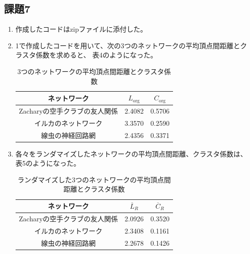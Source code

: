 \documentclass[12pt]{jarticle}
\begin{document}
\clearpage

\subsection{課題7}

\begin{enumerate}
    \item 作成したコードはzipファイルに添付した。
    \item 1で作成したコードを用いて、次の3つのネットワークの平均頂点間距離とクラスタ係数を求めると、
          表4のようになった。

          \begin{table}[htb]
              \caption{3つのネットワークの平均頂点間距離とクラスタ係数}
              \begin{center}
                  \begin{tabular}{|c||c|c|}
                      \hline
                      ネットワーク                  & $L_{\text{org}}$ & $C_{\text{org}}$ \\ \hline \hline
                      Zacharyの空手クラブの友人関係 & 2.4082           & 0.5706           \\ \hline
                      イルカのネットワーク          & 3.3570           & 0.2590           \\ \hline
                      線虫の神経回路網              & 2.4356           & 0.3371           \\ \hline
                  \end{tabular}
              \end{center}
          \end{table}
    \item 各々をランダマイズしたネットワークの平均頂点間距離、クラスタ係数は、
          表5のようになった。

          \begin{table}[htb]
              \caption{ランダマイズした3つのネットワークの平均頂点間距離とクラスタ係数}
              \begin{center}
                  \begin{tabular}{|c||c|c|}
                      \hline
                      ネットワーク                  & $\overline{L}_{R}$ & $\overline{C}_{R}$ \\ \hline \hline
                      Zacharyの空手クラブの友人関係 & 2.0926             & 0.3520             \\ \hline
                      イルカのネットワーク          & 2.3408             & 0.1161             \\ \hline
                      線虫の神経回路網              & 2.2678             & 0.1426             \\ \hline
                  \end{tabular}
              \end{center}
          \end{table}
\end{enumerate}
\end{document}
